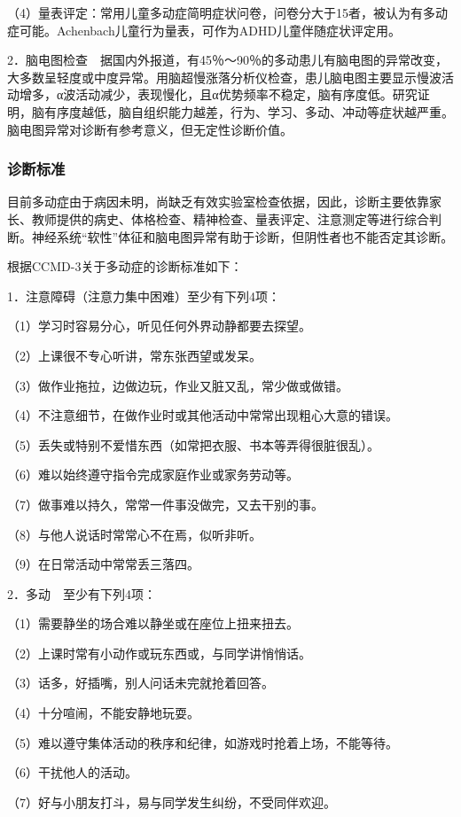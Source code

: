 （4）量表评定：常用儿童多动症简明症状问卷，问卷分大于15者，被认为有多动症可能。Achenbach儿童行为量表，可作为ADHD儿童伴随症状评定用。

2．脑电图检查　据国内外报道，有45％～90％的多动患儿有脑电图的异常改变，大多数呈轻度或中度异常。用脑超慢涨落分析仪检查，患儿脑电图主要显示慢波活动增多，α波活动减少，表现慢化，且α优势频率不稳定，脑有序度低。研究证明，脑有序度越低，脑自组织能力越差，行为、学习、多动、冲动等症状越严重。脑电图异常对诊断有参考意义，但无定性诊断价值。

\subsubsection{诊断标准}

目前多动症由于病因未明，尚缺乏有效实验室检查依据，因此，诊断主要依靠家长、教师提供的病史、体格检查、精神检查、量表评定、注意测定等进行综合判断。神经系统“软性”体征和脑电图异常有助于诊断，但阴性者也不能否定其诊断。

根据CCMD-3关于多动症的诊断标准如下：

1．注意障碍（注意力集中困难）至少有下列4项：

（1）学习时容易分心，听见任何外界动静都要去探望。

（2）上课很不专心听讲，常东张西望或发呆。

（3）做作业拖拉，边做边玩，作业又脏又乱，常少做或做错。

（4）不注意细节，在做作业时或其他活动中常常出现粗心大意的错误。

（5）丢失或特别不爱惜东西（如常把衣服、书本等弄得很脏很乱）。

（6）难以始终遵守指令完成家庭作业或家务劳动等。

（7）做事难以持久，常常一件事没做完，又去干别的事。

（8）与他人说话时常常心不在焉，似听非听。

（9）在日常活动中常常丢三落四。

2．多动　至少有下列4项：

（1）需要静坐的场合难以静坐或在座位上扭来扭去。

（2）上课时常有小动作或玩东西或，与同学讲悄悄话。

（3）话多，好插嘴，别人问话未完就抢着回答。

（4）十分喧闹，不能安静地玩耍。

（5）难以遵守集体活动的秩序和纪律，如游戏时抢着上场，不能等待。

（6）干扰他人的活动。

（7）好与小朋友打斗，易与同学发生纠纷，不受同伴欢迎。

